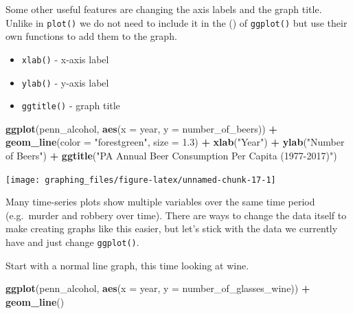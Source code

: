 \documentclass[
  12pt,
]{book}
\newenvironment{Shaded}{\begin{snugshade}}{\end{snugshade}}
\newcommand{\DataTypeTok}[1]{\textcolor[rgb]{0.13,0.29,0.53}{#1}}
\newcommand{\FloatTok}[1]{\textcolor[rgb]{0.00,0.00,0.81}{#1}}
\newcommand{\KeywordTok}[1]{\textcolor[rgb]{0.13,0.29,0.53}{\textbf{#1}}}
\newcommand{\NormalTok}[1]{#1}
\newcommand{\OperatorTok}[1]{\textcolor[rgb]{0.81,0.36,0.00}{\textbf{#1}}}
\newcommand{\StringTok}[1]{\textcolor[rgb]{0.31,0.60,0.02}{#1}}
\providecommand{\tightlist}{%
  \setlength{\itemsep}{0pt}\setlength{\parskip}{0pt}}
\begin{document}
Some other useful features are changing the axis labels and the graph title. Unlike in \texttt{plot()} we do not need to include it in the () of \texttt{ggplot()} but use their own functions to add them to the graph.

\begin{itemize}
\tightlist
\item
  \texttt{xlab()} - x-axis label
\item
  \texttt{ylab()} - y-axis label
\item
  \texttt{ggtitle()} - graph title
\end{itemize}

\begin{Shaded}
\begin{Highlighting}[]
\KeywordTok{ggplot}\NormalTok{(penn\_alcohol, }\KeywordTok{aes}\NormalTok{(}\DataTypeTok{x =}\NormalTok{ year, }\DataTypeTok{y =}\NormalTok{ number\_of\_beers)) }\OperatorTok{+}
\StringTok{  }\KeywordTok{geom\_line}\NormalTok{(}\DataTypeTok{color =} \StringTok{"forestgreen"}\NormalTok{, }\DataTypeTok{size =} \FloatTok{1.3}\NormalTok{) }\OperatorTok{+}
\StringTok{  }\KeywordTok{xlab}\NormalTok{(}\StringTok{"Year"}\NormalTok{) }\OperatorTok{+}
\StringTok{  }\KeywordTok{ylab}\NormalTok{(}\StringTok{"Number of Beers"}\NormalTok{) }\OperatorTok{+}
\StringTok{  }\KeywordTok{ggtitle}\NormalTok{(}\StringTok{"PA Annual Beer Consumption Per Capita (1977{-}2017)"}\NormalTok{)}
\end{Highlighting}
\end{Shaded}

\begin{center}\texttt{[image: graphing\_files/figure-latex/unnamed-chunk-17-1]} \end{center}

Many time-series plots show multiple variables over the same time period (e.g.~murder and robbery over time). There are ways to change the data itself to make creating graphs like this easier, but let's stick with the data we currently have and just change \texttt{ggplot()}.

Start with a normal line graph, this time looking at wine.

\begin{Shaded}
\begin{Highlighting}[]
\KeywordTok{ggplot}\NormalTok{(penn\_alcohol, }\KeywordTok{aes}\NormalTok{(}\DataTypeTok{x =}\NormalTok{ year, }\DataTypeTok{y =}\NormalTok{ number\_of\_glasses\_wine)) }\OperatorTok{+}
\StringTok{  }\KeywordTok{geom\_line}\NormalTok{()}
\end{Highlighting}
\end{Shaded}
\end{document}
